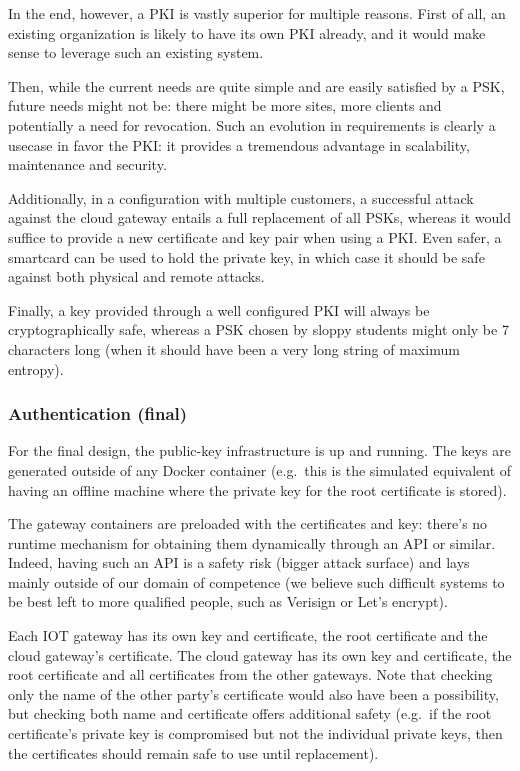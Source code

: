 \documentclass[paper=a4, fontsize=11pt]{scrartcl}
\begin{document}
In the end, however, a PKI is vastly superior for multiple reasons.
First of all, an existing organization is likely to have its own PKI already,
and it would make sense to leverage such an existing system.

Then, while the current needs are quite simple and are easily satisfied by a
PSK, future needs might not be: there might be more sites, more clients and
potentially a need for revocation.
Such an evolution in requirements is clearly a usecase in favor the PKI\@: it
provides a tremendous advantage in scalability, maintenance and security.

Additionally, in a configuration with multiple customers, a successful attack
against the cloud gateway entails a full replacement of all PSKs, whereas it
would suffice to provide a new certificate and key pair when using a PKI\@.
Even safer, a smartcard can be used to hold the private key, in which case it
should be safe against both physical and remote attacks.

Finally, a key provided through a well configured PKI will always be
cryptographically safe, whereas a PSK chosen by sloppy students might only be 7
characters long (when it should have been a very long string of maximum
entropy).

\subsubsection{Authentication (final)}

For the final design, the public-key infrastructure is up and running.
The keys are generated outside of any Docker container (e.g.\ this is the
simulated equivalent of having an offline machine where the private key for the
root certificate is stored).

The gateway containers are preloaded with the certificates and key: there's no
runtime mechanism for obtaining them dynamically through an API or similar.
Indeed, having such an API is a safety risk (bigger attack surface) and lays
mainly outside of our domain of competence (we believe such difficult systems to
be best left to more qualified people, such as Verisign or Let's encrypt).

Each IOT gateway has its own key and certificate, the root certificate and the
cloud gateway's certificate.
The cloud gateway has its own key and certificate, the root certificate and all
certificates from the other gateways.
Note that checking only the name of the other party's certificate would also
have been a possibility, but checking both name and certificate offers
additional safety (e.g.\ if the root certificate's private key is compromised
but not the individual private keys, then the certificates should remain safe to
use until replacement).\\
\end{document}

